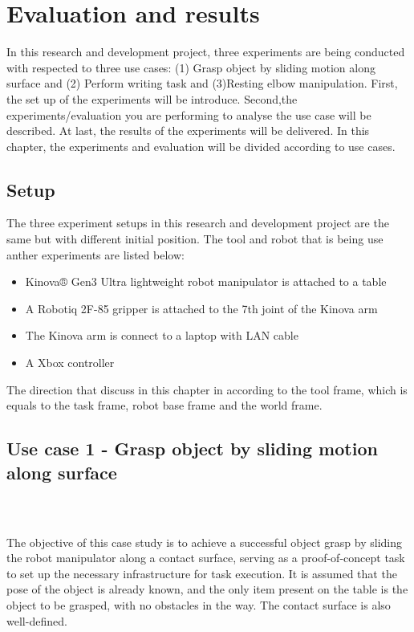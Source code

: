 \documentclass[report.tex]{subfiles}
\begin{document}
\chapter{Evaluation and results}
\label{exp}
In this research and development project, three experiments are being conducted with respected to three use cases: (1) Grasp object by sliding motion along surface and (2) Perform writing task and (3)Resting elbow manipulation. First, the set up of the experiments will be introduce. Second,the experiments/evaluation you are performing to analyse the use case will be described. At last, the results of the experiments will be delivered. In this chapter, the experiments and evaluation will be divided according to use cases.
    \section{Setup}
    The three experiment setups in this research and development project are the same but with different initial position.
    The tool and robot that is being use anther experiments are listed below:
    \begin{itemize}
        \item Kinova® Gen3 Ultra lightweight robot manipulator is attached to a table
        \item A Robotiq 2F-85 gripper is attached to the 7th joint of the Kinova arm
        \item The Kinova arm is connect to a laptop with LAN cable
        \item A Xbox controller
    \end{itemize}
    The direction that discuss in this chapter in according to the tool frame, which is equals to the task frame, robot base frame and the world frame.

    \section{Use case 1 - Grasp object by sliding motion along surface}
    \paragraph{\\}
    \label{us1}
    
The objective of this case study is to achieve a successful object grasp by sliding the robot manipulator along a contact surface, serving as a proof-of-concept task to set up the necessary infrastructure for task execution. It is assumed that the pose of the object is already known, and the only item present on the table is the object to be grasped, with no obstacles in the way. The contact surface is also well-defined.
\end{document}
